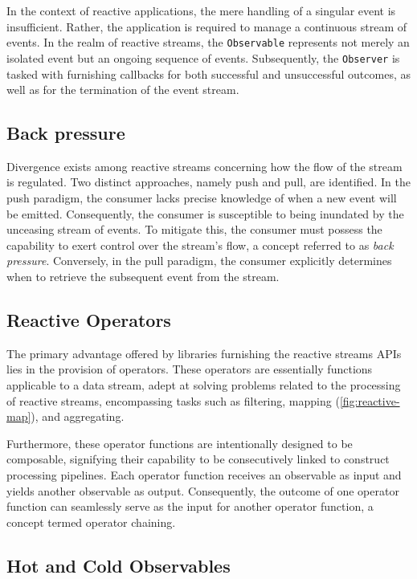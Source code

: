 \documentclass[12pt,a4paper,openright,twoside]{book}
\begin{document}
In the context of reactive applications, the mere handling of a singular event is insufficient. Rather, the application is required to manage a continuous stream of events. In the realm of reactive streams, the \texttt{Observable} represents not merely an isolated event but an ongoing sequence of events. Subsequently, the \texttt{Observer} is tasked with furnishing callbacks for both successful and unsuccessful outcomes, as well as for the termination of the event stream.

\subsection{Back pressure}

Divergence exists among reactive streams concerning how the flow of the stream is regulated. Two distinct approaches, namely push and pull, are identified. In the push paradigm, the consumer lacks precise knowledge of when a new event will be emitted. Consequently, the consumer is susceptible to being inundated by the unceasing stream of events. To mitigate this, the consumer must possess the capability to exert control over the stream's flow, a concept referred to as \textit{back pressure}. Conversely, in the pull paradigm, the consumer explicitly determines when to retrieve the subsequent event from the stream.

\subsection{Reactive Operators}

The primary advantage offered by libraries furnishing the reactive streams APIs lies in the provision of operators. These operators are essentially functions applicable to a data stream, adept at solving problems related to the processing of reactive streams, encompassing tasks such as filtering, mapping (\cref{fig:reactive-map}), and aggregating.

Furthermore, these operator functions are intentionally designed to be composable, signifying their capability to be consecutively linked to construct processing pipelines. Each operator function receives an observable as input and yields another observable as output. Consequently, the outcome of one operator function can seamlessly serve as the input for another operator function, a concept termed operator chaining.

\subsection{Hot and Cold Observables}
\end{document}
